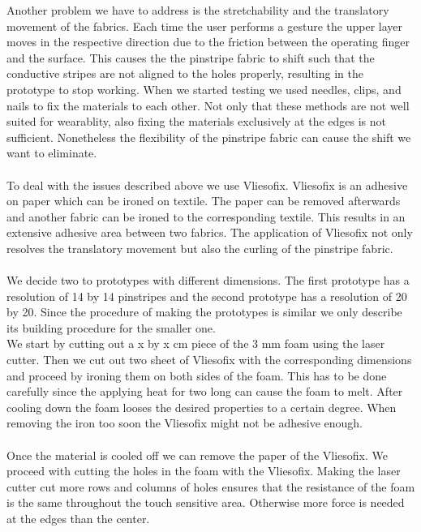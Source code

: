  Another problem we have to address is the stretchability and the translatory movement of the fabrics. Each time the user performs a gesture the upper layer moves in the respective direction due to the friction between the operating finger and the surface. This causes the the pinstripe fabric to shift such that the conductive stripes are not aligned to the holes properly, resulting in the prototype to stop working.  When we started testing we used needles, clips, and nails to fix the materials to each other. Not only that these methods are not well suited for wearablity, also fixing the materials exclusively at the edges is not sufficient. Nonetheless the flexibility of the pinstripe fabric can cause the shift we want to eliminate. 
\\ \\
 To deal with the issues described above we use Vliesofix.  Vliesofix is an adhesive on paper which can be ironed on textile. The paper can be removed afterwards and another fabric can be ironed to the corresponding textile. This results in an extensive adhesive area between two fabrics. The application of Vliesofix not only resolves the translatory movement but also the curling of the pinstripe fabric.
\\ \\
We decide two to prototypes with different dimensions. The first prototype has a resolution of 14 by 14 pinstripes and the second prototype has a resolution of 20 by 20. Since the procedure of making the prototypes is similar we only describe its building procedure for the smaller one. 
\\
We start by cutting out a  x by x cm piece of the 3 mm foam using the laser cutter. Then we cut out two sheet of Vliesofix with the corresponding dimensions and proceed by ironing them on both sides of the foam. This has to be done carefully since the applying heat for two long can cause the foam to melt. After cooling down the foam looses the desired properties to a certain degree. When removing the iron too soon the Vliesofix might not be adhesive enough. 
\\ \\
Once the material is cooled off we can remove the paper of the Vliesofix. We proceed with cutting the holes in the foam with the Vliesofix. Making the laser cutter cut more rows and columns of holes ensures that the resistance of the foam is the same throughout the touch sensitive area. Otherwise more force is needed at the edges than the center. 
